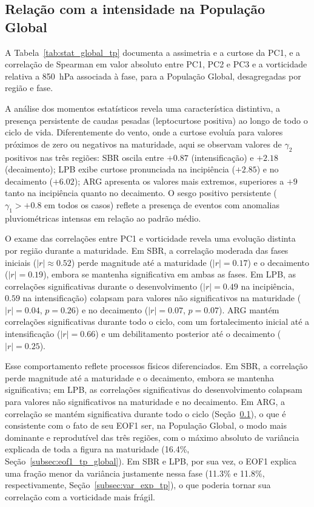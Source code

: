 

\subsection{Relação com a intensidade na População Global}\label{subsec:pc1_global_tp}

A Tabela~\ref{tab:stat_global_tp} documenta a assimetria e a curtose da PC1, e a correlação de Spearman em valor absoluto entre PC1, PC2 e PC3 e a vorticidade relativa a 850~hPa associada à fase, para a População Global, desagregadas por região e fase.

A análise dos momentos estatísticos revela uma característica distintiva, a presença persistente de caudas pesadas (leptocurtose positiva) ao longo de todo o ciclo de vida. Diferentemente do vento, onde a curtose evoluía para valores próximos de zero ou negativos na maturidade, aqui se observam valores de $\gamma_2$ positivos nas três regiões: SBR oscila entre $+0.87$ (intensificação) e $+2.18$ (decaimento); LPB exibe curtose pronunciada na incipiência ($+2.85$) e no decaimento ($+6.02$); ARG apresenta os valores mais extremos, superiores a $+9$ tanto na incipiência quanto no decaimento. O sesgo positivo persistente ($\gamma_1 > +0.8$ em todos os casos) reflete a presença de eventos com anomalias pluviométricas intensas em relação ao padrão médio.

O exame das correlações entre PC1 e vorticidade revela uma evolução distinta por região durante a maturidade. Em SBR, a correlação moderada das fases iniciais ($|r|\approx0.52$) perde magnitude até a maturidade ($|r|=0.17$) e o decaimento ($|r|=0.19$), embora se mantenha significativa em ambas as fases. Em LPB, as correlações significativas durante o desenvolvimento ($|r|=0.49$ na incipiência, $0.59$ na intensificação) colapsam para valores não significativos na maturidade ($|r|=0.04$, $p=0.26$) e no decaimento ($|r|=0.07$, $p=0.07$). ARG mantém correlações significativas durante todo o ciclo, com um fortalecimento inicial até a intensificação ($|r|=0.66$) e um debilitamento posterior até o decaimento ($|r|=0.25$).

Esse comportamento reflete processos físicos diferenciados. Em SBR, a correlação perde magnitude até a maturidade e o decaimento, embora se mantenha significativa; em LPB, as correlações significativas do desenvolvimento colapsam para valores não significativos na maturidade e no decaimento. Em ARG, a correlação se mantém significativa durante todo o ciclo (Seção~\ref{subsec:pc1_global_tp}), o que é consistente com o fato de seu EOF1 ser, na População Global, o modo mais dominante e reprodutível das três regiões, com o máximo absoluto de variância explicada de toda a figura na maturidade (16.4\%, Seção~\ref{subsec:eof1_tp_global}). Em SBR e LPB, por sua vez, o EOF1 explica uma fração menor da variância justamente nessa fase (11.3\% e 11.8\%, respectivamente, Seção~\ref{subsec:var_exp_tp}), o que poderia tornar sua correlação com a vorticidade mais frágil.

